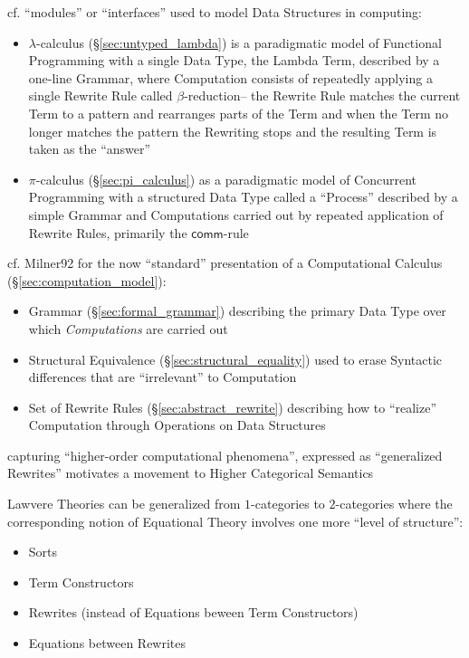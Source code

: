 cf. ``modules'' or ``interfaces'' used to model Data Structures in computing:
\begin{itemize}
\item $\lambda$-calculus (\S\ref{sec:untyped_lambda}) is a paradigmatic model of
  Functional Programming with a single Data Type, the Lambda Term, described by
  a one-line Grammar, where Computation consists of repeatedly applying a single
  Rewrite Rule called $\beta$-reduction-- the Rewrite Rule matches the current
  Term to a pattern and rearranges parts of the Term and when the Term no longer
  matches the pattern the Rewriting stops and the resulting Term is taken as the
  ``answer''
\item $\pi$-calculus (\S\ref{sec:pi_calculus}) as a paradigmatic model of
  Concurrent Programming with a structured Data Type called a ``Process''
  described by a simple Grammar and Computations carried out by repeated
  application of Rewrite Rules, primarily the $\mathsf{comm}$-rule
\end{itemize}

cf. Milner92 \cite{milner92} for the now ``standard'' presentation of a
Computational Calculus (\S\ref{sec:computation_model}):
\begin{itemize}
  \item Grammar (\S\ref{sec:formal_grammar}) describing the primary Data Type
    over which \emph{Computations} are carried out
  \item Structural Equivalence (\S\ref{sec:structural_equality}) used to erase
    Syntactic differences that are ``irrelevant'' to Computation
  \item Set of Rewrite Rules (\S\ref{sec:abstract_rewrite}) describing how to
    ``realize'' Computation through Operations on Data Structures
\end{itemize}

capturing ``higher-order computational phenomena'', expressed as ``generalized
Rewrites'' motivates a movement to Higher Categorical Semantics

Lawvere Theories can be generalized from $1$-categories to $2$-categories where
the corresponding notion of Equational Theory involves one more ``level of
structure'':
\begin{itemize}
  \item Sorts
  \item Term Constructors
  \item Rewrites (instead of Equations beween Term Constructors)
  \item Equations between Rewrites
\end{itemize}

